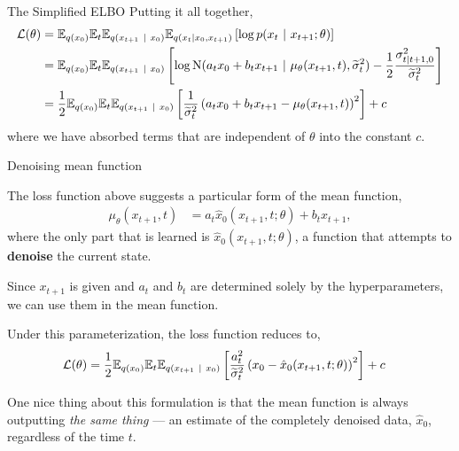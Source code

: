 \documentclass[aspectratio=169]{beamer}
\begin{document}
\begin{frame}[t,allowframebreaks]{The Simplified ELBO}
Putting it all together, 
\begin{align*}
\mathcal{L}(\theta) 
&= \mathbb{E}_{q(x_0)} \mathbb{E}_t \mathbb{E}_{q(x_{t+1} ~\vert~ x_0)} \mathbb{E}_{q(x_t | x_0, x_{t+1})} \left[ \log p(x_t ~\vert~ x_{t+1}; \theta) \right] \\
&= \mathbb{E}_{q(x_0)} \mathbb{E}_t \mathbb{E}_{q(x_{t+1} ~\vert~ x_0)} \left[ \log \mathrm{N}(a_t x_0 + b_t x_{t+1} ~\vert~ \mu_\theta(x_{t+1}, t), \widetilde{\sigma}_t^2) -\frac{1}{2} \frac{\sigma_{t|t+1,0}^2}{\widetilde{\sigma}_t^2} \right] \\
&= \frac{1}{2} \mathbb{E}_{q(x_0)} \mathbb{E}_t \mathbb{E}_{q(x_{t+1} ~\vert~ x_0)} \left[ \frac{1}{\widetilde{\sigma}_t^2} \left( a_t x_0 + b_t x_{t+1} - \mu_\theta(x_{t+1}, t) \right)^2 \right] + c
\end{align*} 
where we have absorbed terms that are independent of
\(\theta\) into the constant \(c\).
\end{frame}

\begin{frame}[t,allowframebreaks]{Denoising mean function}\label{denoising-mean-function}

The loss function above suggests a particular form of the mean function,
\begin{align*}
\mu_\theta(x_{t+1}, t) &= a_t \hat{x}_0(x_{t+1}, t; \theta) + b_t x_{t+1},
\end{align*} 
where the only part that is learned is
\(\hat{x}_0(x_{t+1}, t; \theta)\), a function that attempts to
\textbf{denoise} the current state. 

Since \(x_{t+1}\) is given and
\(a_t\) and \(b_t\) are determined solely by the hyperparameters, we can
use them in the mean function.

Under this parameterization, the loss function reduces to,
\begin{align*}
\mathcal{L}(\theta) 
&= \frac{1}{2} \mathbb{E}_{q(x_0)} \mathbb{E}_t \mathbb{E}_{q(x_{t+1} ~\vert~ x_0)} \left[ \frac{a_t^2}{\widetilde{\sigma}_t^2} \left(x_0 - \hat{x}_0(x_{t+1}, t; \theta) \right)^2 \right] + c
\end{align*}

One nice thing about this formulation is that the mean function is
always outputting \textit{the same thing} --- an estimate of the completely
denoised data, \(\hat{x}_0\), regardless of the time \(t\).

\end{frame}
\end{document}

